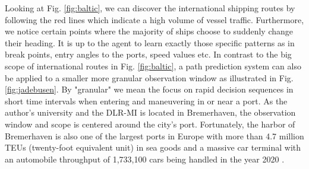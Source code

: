 Looking at Fig. \ref{fig:baltic}, we can discover the international shipping routes by following the red lines which indicate a high volume of vessel traffic. Furthermore, we notice certain points where the majority of ships choose to suddenly change their heading. It is up to the agent to learn exactly those specific patterns as in break points, entry angles to the ports, speed values etc. In contrast to the big scope of international routes in Fig. \ref{fig:baltic}, a path prediction system can also be applied to a smaller more granular observation window as illustrated in Fig. \ref{fig:jadebusen}. By "granular" we mean the focus on rapid decision sequences in short time intervals when entering and maneuvering in or near a port. As the author's university and the DLR-MI is located in Bremerhaven, the observation window and scope is centered around the city's port. Fortunately, the harbor of Bremerhaven is also one of the largest ports in Europe with more than 4.7 million TEUs (twenty-foot equivalent unit) in sea goods and a massive car terminal with an automobile throughput of 1,733,100 cars being handled in the year 2020  \cite[]{bremenports}.